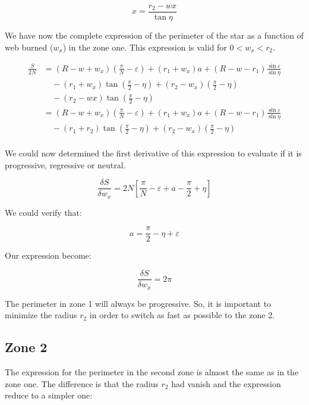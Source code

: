 \documentclass[11pt, titlepage]{article}
\begin{document}
  $$x = \frac{r_2-wx}{\tan{\eta}}$$

 We have now the complete expression of the perimeter of the star as a
 function of web burned ($w_x$) in the zone one. This expression is
 valid for $0 < w_x < r_2$.

\begin{equation}
  \begin{split}
  \frac{S}{2N} &= (R-w+w_x)(\frac{\pi}{N} - \varepsilon) +
                  (r_1+w_x)a+(R-w-r_1)\frac{\sin{\varepsilon}}{\sin{\eta}}\\ 
               & \quad - (r_1+w_x)\tan{(\frac{\pi}{2}-\eta)}
               + (r_2-w_x)(\frac{\pi}{2}-\eta) \\
               & \quad - (r_2-wx)\tan{(\frac{\pi}{2}-\eta)}\\
               &= (R-w+w_x)(\frac{\pi}{N} - \varepsilon) +
                  (r_1+w_x)a+(R-w-r_1)\frac{\sin{\varepsilon}}{\sin{\eta}}\\ 
               & \quad - (r_1+r_2)\tan{(\frac{\pi}{2}-\eta)}
               + (r_2-w_x)(\frac{\pi}{2}-\eta)\\
  \end{split}
\end{equation}


  We could now determined the first derivative of this expression to
  evaluate if it is progressive, regressive or neutral.

  \begin{equation}
  \frac{\delta S}{\delta w_x} = 2N\left[ \frac{\pi}{N} - \varepsilon + a -
  \frac{\pi}{2} + \eta \right]
  \end{equation}

  We could verify that:

  $$a = \frac{\pi}{2} - \eta + \varepsilon$$

  Our expression become:

  \begin{equation}
  \frac{\delta S}{\delta w_x} = 2\pi
  \end{equation}

  
  The perimeter in zone 1 will always be progressive. So, it is
  important to minimize the radius $r_2$ in order to switch as fast as
  possible to the zone 2.


  \subsection{Zone 2}
  
  The expression for the perimeter in the second zone is almost the
  same as in the zone one. The difference is that the radius $r_2$ had
  vanish and the expression reduce to a simpler one:
\end{document}
